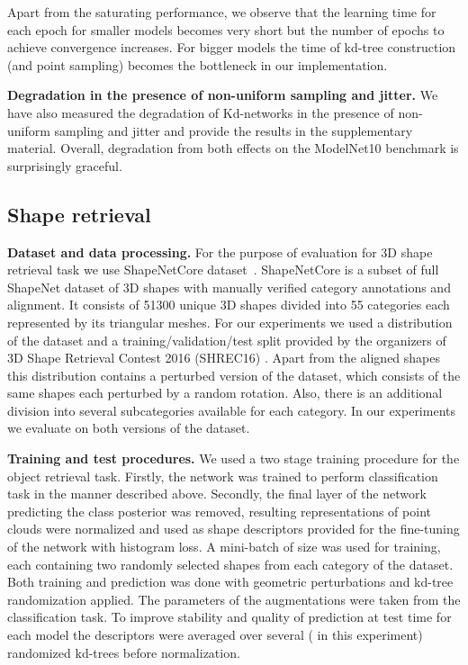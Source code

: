 \documentclass[10pt,twocolumn,letterpaper]{article}
\begin{document}
Apart from the saturating performance, we observe that the learning time for each epoch for smaller models becomes very short but the number of epochs to achieve convergence increases. For bigger models the time of kd-tree construction (and point sampling) becomes the bottleneck in our implementation.

\textbf{Degradation in the presence of non-uniform sampling and jitter.} We have also measured the degradation of Kd-networks in the presence of non-uniform sampling and jitter and provide the results in the supplementary material. Overall, degradation from both effects on the ModelNet10 benchmark is surprisingly graceful.

\subsection{Shape retrieval}

\textbf{Dataset and data processing.} For the purpose of evaluation for 3D shape retrieval task we use ShapeNetCore dataset~\cite{Chang15}. ShapeNetCore is a subset of full ShapeNet dataset of 3D shapes with manually verified category annotations and alignment. It consists of 51300 unique 3D shapes divided into 55 categories each represented by its triangular meshes. For our experiments we used a distribution of the dataset and a training/validation/test split provided by the organizers of 3D Shape Retrieval Contest 2016 (SHREC16) \cite{Savva16}. Apart from the aligned shapes this distribution contains a perturbed version of the dataset, which consists of the same shapes each perturbed by a random rotation. Also, there is an additional division into several subcategories available for each category. In our experiments we evaluate on both versions of the dataset.

\textbf{Training and test procedures.} We used a two stage training procedure for the object retrieval task. Firstly, the network was trained to perform classification task in the manner described above. Secondly, the final layer of the network predicting the class posterior was removed, resulting representations of point clouds were normalized and used as shape descriptors provided for the fine-tuning of the network with histogram loss. A mini-batch of size  was used for training, each containing two randomly selected shapes from each category of the dataset. Both training and prediction was done with geometric perturbations and kd-tree randomization applied. The parameters of the augmentations were taken from the classification task. To improve stability and quality of prediction at test time for each model the descriptors were averaged over several ( in this experiment) randomized kd-trees before normalization.
\end{document}

